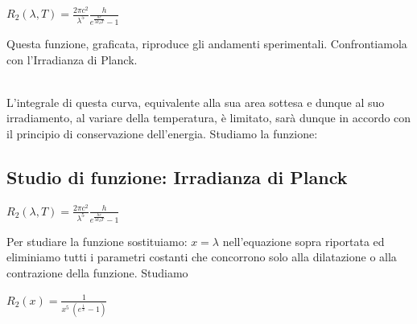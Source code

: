 \documentclass{article}
\begin{document}
\begin{center}
    $ R_2(\lambda, T) = \frac{2\pi c^2}{\lambda^5} \frac{h}{e^{\frac{hc}{\lambda k_B T} }-1} $
\end{center}
Questa funzione, graficata, riproduce gli  andamenti sperimentali. Confrontiamola con l'Irradianza di Planck. 
\begin{figure}[h]
\centering
{}
\end{figure}
\\
L'integrale di questa curva, equivalente alla sua area sottesa e dunque al suo irradiamento, al variare della temperatura, è limitato,  sarà dunque in accordo con il principio di conservazione dell'energia.
Studiamo la funzione:
\newpage
\subsection{Studio di funzione: Irradianza di Planck}
\begin{center}
     $ R_2(\lambda, T) = \frac{2\pi c^2}{\lambda^5} \frac{h}{e^{\frac{hc}{\lambda k_B T} }-1} $

\end{center}
Per studiare la funzione sostituiamo: $x = \lambda$ nell'equazione sopra riportata ed eliminiamo tutti i parametri costanti che concorrono solo alla dilatazione o alla contrazione della funzione. Studiamo
\begin{center}
    $R_2(x) = \frac{1}{x^5 \ (e^{\frac{1}{x } }-1)}$
\end{center}
\vspace*{-0.20in}
\end{document}

